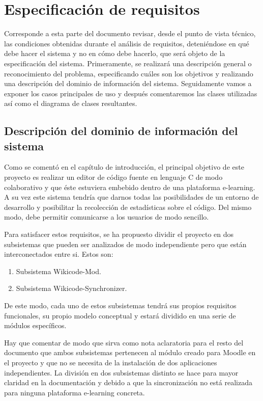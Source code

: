 \chapter[Especificación de requisitos]{\label{}
Especificación de requisitos}

Corresponde a esta parte del documento revisar, desde el punto de vista técnico, las condiciones obtenidas durante el análisis de requisitos, deteniéndose en qué debe hacer el sistema y no en cómo debe hacerlo, que será objeto de la especificación del sistema. Primeramente, se realizará una descripción general o reconocimiento del problema, especificando cuáles son los objetivos y realizando una descripción del dominio de información del sistema. Seguidamente vamos a exponer los casos principales de uso y después comentaremos las clases utilizadas así como el diagrama de clases resultantes.

\section{Descripción del dominio de información del sistema}

Como se comentó en el capítulo de introducción, el principal objetivo de este proyecto es realizar un editor de código fuente en lenguaje C de modo colaborativo y que éste estuviera embebido dentro de una plataforma e-learning. A su vez este sistema tendría que darnos todas las posibilidades de un entorno de desarrollo y posibilitar la recolección de estadísticas sobre el código. Del mismo modo, debe permitir comunicarse a los usuarios de modo sencillo.

Para satisfacer estos requisitos, se ha propuesto dividir el proyecto en dos subsistemas que pueden ser analizados de modo independiente pero que están interconectados entre si. Estos son:

\begin{enumerate}
	\item Subsistema Wikicode-Mod.
	\item Subsistema Wikicode-Synchronizer.
\end{enumerate}

De este modo, cada uno de estos subsistemas tendrá sus propios requisitos funcionales, su propio modelo conceptual y estará dividido en una serie de módulos específicos.

Hay que comentar de modo que sirva como nota aclaratoria para el resto del documento que ambos subsistemas pertenecen al módulo creado para Moodle en el proyecto y que no se necesita de la instalación de dos aplicaciones independientes. La división en dos subsistemas distinto se hace para mayor claridad en la documentación y debido a que la sincronización no está realizada para ninguna plataforma e-learning concreta.


